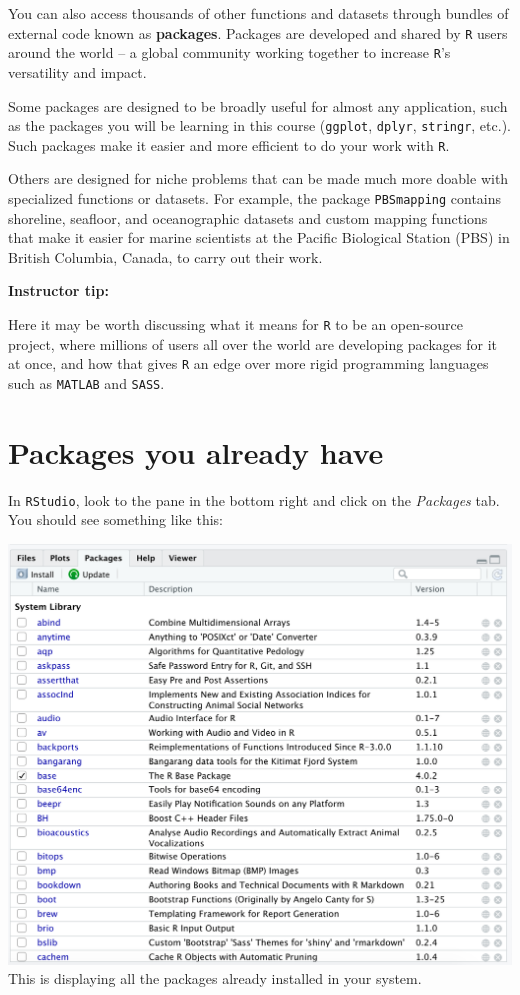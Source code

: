 \documentclass[
]{book}
\begin{document}
You can also access thousands of other functions and datasets through bundles of external code known as \textbf{packages}. Packages are developed and shared by \texttt{R} users around the world -- a global community working together to increase \texttt{R}'s versatility and impact.

Some packages are designed to be broadly useful for almost any application, such as the packages you will be learning in this course (\texttt{ggplot}, \texttt{dplyr}, \texttt{stringr}, etc.). Such packages make it easier and more efficient to do your work with \texttt{R}.

Others are designed for niche problems that can be made much more doable with specialized functions or datasets. For example, the package \texttt{PBSmapping} contains shoreline, seafloor, and oceanographic datasets and custom mapping functions that make it easier for marine scientists at the Pacific Biological Station (PBS) in British Columbia, Canada, to carry out their work.

\leavevmode{}%
\textbf{Instructor tip:}

Here it may be worth discussing what it means for \texttt{R} to be an open-source project, where millions of users all over the world are developing packages for it at once, and how that gives \texttt{R} an edge over more rigid programming languages such as \texttt{MATLAB} and \texttt{SASS}.

\hypertarget{packages-you-already-have}{%
\section*{Packages you already have}\label{packages-you-already-have}}

In \texttt{RStudio}, look to the pane in the bottom right and click on the \emph{Packages} tab. You should see something like this:

\includegraphics{img/rstudio_packages.png}
This is displaying all the packages already installed in your system.
\end{document}
